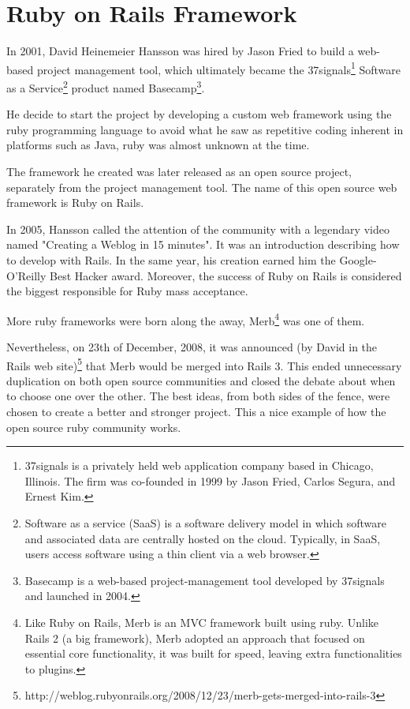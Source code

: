\section{Ruby on Rails Framework} 
In 2001, David Heinemeier Hansson was hired by Jason Fried to build a web-based project management tool, 
which ultimately became the 
\textsf{37signals}\footnote{
  37signals is a privately held web application company based in Chicago, Illinois. 
  The firm was co-founded in 1999 by Jason Fried, Carlos Segura, and Ernest Kim.
}
\textsf{Software as a Service}\footnote{
 Software as a service (SaaS) is a software delivery model in which software and associated data are centrally hosted on the cloud.
 Typically, in SaaS, users access software using a thin client via a web browser.
}  
product named 
\textsf{Basecamp}\footnote{
  Basecamp is a web-based project-management tool developed by 37signals and launched in 2004.
}.

He decide to start the project by developing a custom web framework using the ruby programming language
to avoid what he saw as repetitive coding inherent in platforms such as Java,
ruby was almost unknown at the time.

The framework he created was later released as an open source project, separately from the project management tool. 
The name of this open source web framework is Ruby on Rails.

In 2005, Hansson called the attention of the community with a legendary video named "Creating a Weblog in 15 minutes". 
It was an introduction describing how to develop with Rails.
In the same year, his creation earned him the Google-O'Reilly Best Hacker award.
Moreover, the success of Ruby on Rails is considered the biggest responsible for Ruby mass acceptance.

More ruby frameworks were born along the away, 
\textsf{Merb}\footnote{
 Like Ruby on Rails, Merb is an MVC framework built using ruby.
 Unlike Rails 2 (a big framework), Merb adopted an approach that focused on essential core functionality, 
 it was built for speed, leaving extra functionalities to plugins.
}
was one of them.

Nevertheless, on 23th of December, 2008, it was announced
\textsf{(by David in the Rails web site)}\footnote{
 http://weblog.rubyonrails.org/2008/12/23/merb-gets-merged-into-rails-3
}
that Merb would be merged into Rails 3.
This ended unnecessary duplication on both open source communities 
and closed the debate about when to choose one over the other.
The best ideas, from both sides of the fence, were chosen to create a better and stronger project.
This a nice example of how the open source ruby community works. 

